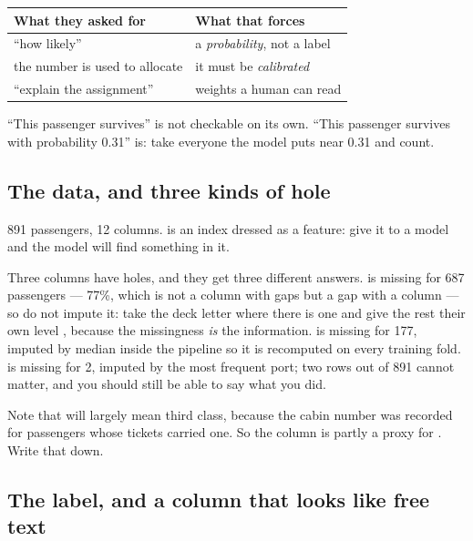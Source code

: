 \documentclass[11pt,a4paper]{article}
\begin{document}
\begin{center}
\small
\begin{tabular}{lp{}}
\toprule
\textbf{What they asked for} & \textbf{What that forces} \\
\midrule
``how likely''    & a \emph{probability}, not a label \\
the number is used to allocate & it must be \emph{calibrated} \\
``explain the assignment'' & weights a human can read \\
\bottomrule
\end{tabular}
\end{center}

\begin{keybox}[title={Why requirement 1 is not a formatting preference}]
``This passenger survives'' is not checkable on its own. ``This passenger
survives with probability 0.31'' is: take everyone the model puts near 0.31 and
count.
\end{keybox}

\subsection{The data, and three kinds of hole}

891 passengers, 12 columns.  is an index dressed as a
feature: give it to a model and the model will find something in it.

Three columns have holes, and they get three different answers.
 is missing for 687 passengers --- 77\%, which is not a column with
gaps but a gap with a column --- so do not impute it: take the deck letter
where there is one and give the rest their own level , because the
missingness \emph{is} the information.  is missing for 177, imputed
by median inside the pipeline so it is recomputed on every training fold.
 is missing for 2, imputed by the most frequent port; two rows
out of 891 cannot matter, and you should still be able to say what you did.

Note that  will largely mean third class, because the cabin
number was recorded for passengers whose tickets carried one. So the column is
partly a proxy for . Write that down.

\subsection{The label, and a column that looks like free text}
\end{document}
